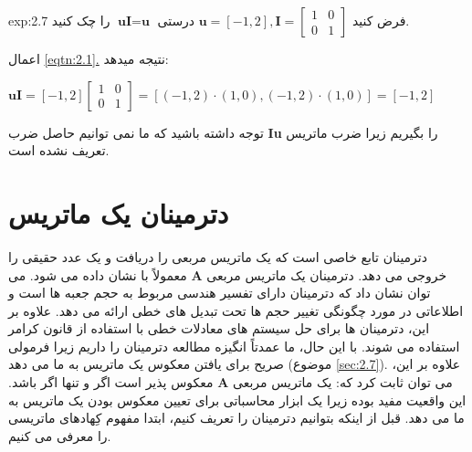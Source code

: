 {\begin{spacing}{1.5}
        \begin{example}{exp:2.7}
            \Large
            فرض کنید
            $\textbf{u}=[-1,2], \textbf{I}=\begin{bmatrix}
                                               1 & 0 \\
                                               0 & 1
            \end{bmatrix}$
            درستی $\textbf{uI}=\textbf{u}$ را چک کنید.

            اعمال \hyperref[eqtn:2.1]{\ref{eqtn:2.1}.} نتیجه میدهد:

            $\textbf{uI}=[-1,2]\begin{bmatrix}
                                   1 & 0 \\
                                   0 & 1
            \end{bmatrix}=\left[ (-1,2)\cdot(1,0), (-1,2)\cdot(1,0) \right]=[-1, 2]$

            توجه داشته باشید که ما نمی توانیم حاصل ضرب \textbf{Iu} را بگیریم زیرا ضرب ماتریس تعریف نشده است.
        \end{example}
    \end{spacing}
}


\section{\textbf{دترمینان یک ماتریس}}
\label{sec:2.5}
{
    \Large
    \begin{spacing}{1.3}
        دترمینان تابع خاصی است که یک ماتریس مربعی را دریافت و یک عدد حقیقی را خروجی می دهد.
        دترمینان یک ماتریس مربعی $\textbf{A}$ معمولاً با  نشان داده می شود.
        می توان نشان داد که دترمینان دارای تفسیر هندسی مربوط به حجم جعبه ها است و اطلاعاتی در مورد چگونگی تغییر حجم ها تحت تبدیل های خطی ارائه می دهد.
        علاوه بر این، دترمینان ها برای حل سیستم های معادلات خطی با استفاده از قانون کرامر استفاده می شوند.
        با این حال، ما عمدتاً انگیزه مطالعه دترمینان را داریم زیرا فرمولی صریح برای یافتن معکوس یک ماتریس به ما می دهد (موضوع \ref{sec:2.7}).
        علاوه بر این، می توان ثابت کرد که: یک ماتریس مربعی $\textbf{A}$ معکوس پذیر است اگر و تنها اگر  باشد.
        این واقعیت مفید بوده زیرا یک ابزار محاسباتی برای تعیین معکوس بودن یک ماتریس به ما می دهد.
        قبل از اینکه بتوانیم دترمینان را تعریف کنیم، ابتدا مفهوم کِهادهای ماتریسی را معرفی می کنیم.
    \end{spacing}
}

